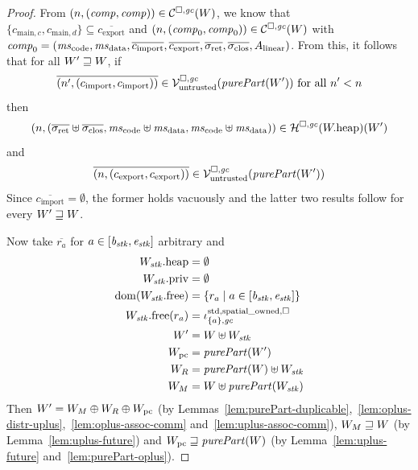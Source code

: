 \documentclass[a4paper]{article}
\begin{document}
\begin{proof}
  From $\left(n,(\mathit{comp},\mathit{comp})\right) \in \mathcal{C}^{\square,\mathit{gc}}(W)$, we know that
  $\{c_{\mathrm{main},c}, c_{\mathrm{main},d}\}\subseteq \overline{c_{\mathrm{export}}}$ and 
  $\left(n,(\mathit{comp}_0,\mathit{comp}_0)\right) \in \mathcal{C}^{\square,\mathit{gc}}(W)$ with $\var{comp}_0 = (\mscode, \msdata, \overline{c_{\mathrm{import}}}, \overline{c_{\mathrm{export}}}, \sigrets, \sigcloss,A_\linear)$.
  From this, it follows that for all  $W' \sqsupseteq W$, if
  \begin{equation*}
    \overline{\npair[n']{(c_{\mathrm{import}},c_{\mathrm{import}})}} \in \lrv(\purePart{W'}) \text{ for all $n' < n$}
  \end{equation*}
  then
  \begin{equation*}
    \npair{(\sigrets\uplus\sigcloss,\mscode\uplus \msdata, \mscode\uplus\msdata)} \in \lrheap(\pwheap)(W')
  \end{equation*}
  and
  \begin{equation*}
    \overline{\npair{(c_{\mathrm{export}},c_{\mathrm{export}})}} \in \lrv(\purePart{W'})
  \end{equation*}
  Since $\overline{c_{\mathrm{import}}} = \emptyset$, the former holds vacuously and the latter two results follow for every $W' \sqsupseteq W$.
  
  Now take $\overline{r_a}$ for $a \in [\mathit{b}_{\mathit{stk}},\mathit{e}_{\mathit{stk}}]$ arbitrary and 
  \begin{align*}
    \pwheap[W_\stk] &= \emptyset\\
    \pwpriv[W_\stk] &= \emptyset\\
    \dom(\pwfree[W_\stk]) &= \{r_a \mid a \in [\baddr_\stk,\eaddr_\stk]\}\\
    \pwfree[W_\stk](r_a) &= \stdreg{\{a\},\gc}{\spatialo}\\
    W' &= W \uplus W_\stk\\
    W_\pcreg &= \purePart{W'}\\
    W_R &= \purePart{W} \uplus W_\stk\\
    W_M &= W \uplus \purePart{W_\stk}
  \end{align*}
  Then $W' = W_M \oplus W_R \oplus W_{\mathrm{pc}}$ (by Lemmas~\ref{lem:purePart-duplicable},~\ref{lem:oplus-distr-uplus},~\ref{lem:oplus-assoc-comm} and~\ref{lem:uplus-assoc-comm}), $W_M \sqsupseteq W$ (by Lemma~\ref{lem:uplus-future}) and $W_\pcreg \future \purePart{W}$ (by Lemma~\ref{lem:uplus-future} and~\ref{lem:purePart-oplus}).


\end{proof}
\end{document}
